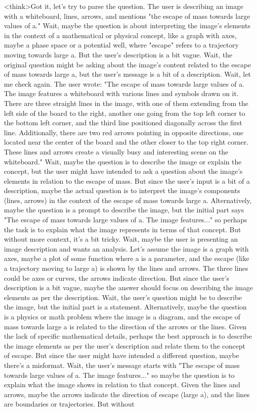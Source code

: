 <think>Got it, let's try to parse the question. The user is describing an image with a whiteboard, lines, arrows, and mentions "the escape of mass towards large values of a." Wait, maybe the question is about interpreting the image's elements in the context of a mathematical or physical concept, like a graph with axes, maybe a phase space or a potential well, where "escape" refers to a trajectory moving towards large a. But the user's description is a bit vague. Wait, the original question might be asking about the image's content related to the escape of mass towards large a, but the user's message is a bit of a description. Wait, let me check again. The user wrote: "The escape of mass towards large values of a. The image features a whiteboard with various lines and symbols drawn on it. There are three straight lines in the image, with one of them extending from the left side of the board to the right, another one going from the top left corner to the bottom left corner, and the third line positioned diagonally across the first line. Additionally, there are two red arrows pointing in opposite directions, one located near the center of the board and the other closer to the top right corner. These lines and arrows create a visually busy and interesting scene on the whiteboard." Wait, maybe the question is to describe the image or explain the concept, but the user might have intended to ask a question about the image's elements in relation to the escape of mass. But since the user's input is a bit of a description, maybe the actual question is to interpret the image's components (lines, arrows) in the context of the escape of mass towards large a. Alternatively, maybe the question is a prompt to describe the image, but the initial part says "The escape of mass towards large values of a. The image features..." so perhaps the task is to explain what the image represents in terms of that concept. But without more context, it's a bit tricky. Wait, maybe the user is presenting an image description and wants an analysis. Let's assume the image is a graph with axes, maybe a plot of some function where a is a parameter, and the escape (like a trajectory moving to large a) is shown by the lines and arrows. The three lines could be axes or curves, the arrows indicate direction. But since the user's description is a bit vague, maybe the answer should focus on describing the image elements as per the description. Wait, the user's question might be to describe the image, but the initial part is a statement. Alternatively, maybe the question is a physics or math problem where the image is a diagram, and the escape of mass towards large a is related to the direction of the arrows or the lines. Given the lack of specific mathematical details, perhaps the best approach is to describe the image elements as per the user's description and relate them to the concept of escape. But since the user might have intended a different question, maybe there's a misformat. Wait, the user's message starts with "The escape of mass towards large values of a. The image features..." so maybe the question is to explain what the image shows in relation to that concept. Given the lines and arrows, maybe the arrows indicate the direction of escape (large a), and the lines are boundaries or trajectories. But without 